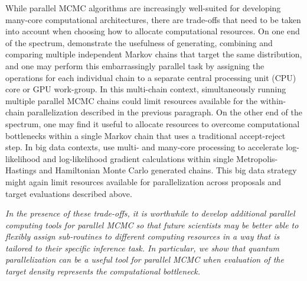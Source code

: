 \documentclass[12pt]{article} %
\begin{document}
While parallel MCMC algorithms are increasingly well-suited for developing many-core computational architectures, there are trade-offs that need to be taken into account when choosing how to allocate computational resources.  On one end of the spectrum, \citet{gelman1992inference} demonstrate the usefulness of generating, combining and comparing multiple independent Markov chains that target the same distribution, and one may perform this embarrassingly parallel task by assigning the operations for each individual chain to a separate central processing unit (CPU) core or GPU work-group.  In this multi-chain context, simultaneously running multiple parallel MCMC chains could limit resources available for the within-chain parallelization described in the previous paragraph.  On the other end of the spectrum, one may find it useful to allocate resources to overcome computational bottlenecks within a single Markov chain that uses a traditional accept-reject step. In big data contexts, \citet{massive,holbrook2021scalable,holbrook2022bayesian,holbrook2022viral} use multi- and many-core processing to accelerate log-likelihood and log-likelihood gradient calculations within single Metropolis-Hastings and Hamiltonian Monte Carlo \citep{neal2011mcmc} generated chains.  This big data strategy might again limit resources available for parallelization across proposals and target evaluations described above.

\emph{In the presence of these trade-offs, it is worthwhile to develop additional parallel computing tools for parallel MCMC so that future scientists may be better able to flexibly assign sub-routines to different computing resources in a way that is tailored to their specific inference task.  In particular, we show that quantum parallelization can be a useful tool for parallel MCMC when evaluation of the target density represents the computational bottleneck.}
\end{document}
